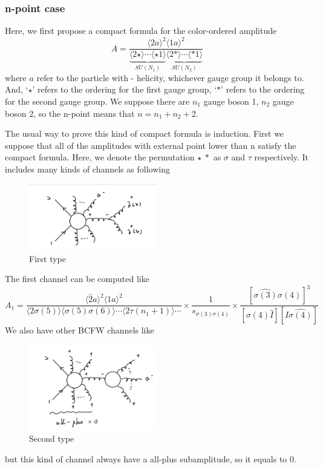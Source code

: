 \documentclass[12pt]{article}
\numberwithin{equation}{section}
\newcommand{\avg}[1]{\langle #1 \rangle}
\newcommand{\asqu}[1]{{\langle#1\rangle}^2}
\begin{document}
\subsubsection{n-point case}
Here, we first propose a compact formula for the color-ordered amplitude
\begin{equation}
    A=\frac{\asqu{2a}\!\asqu{1a}}{\underbrace{\avg{2\star}\cdots \avg{\star 1}}_{SU(N_1)}\underbrace{\avg{2\ast }\cdots \avg{\ast 1}}_{SU(N_2)}}
\end{equation}
where $a$ refer to the particle with - helicity, whichever gauge group it belongs to. And, `$\star$' refers to the ordering for the first gauge group, `$\ast$'
refers to the ordering for the second gauge group. We suppose there are $n_1$ gauge boson 1, $n_2$ gauge boson 2, so the n-point means that $n=n_1+n_2+2$.
\par
The usual way to prove this kind of compact formula is induction. First we suppose that all of the amplitudes with external point lower than n satisfy the compact formula.
Here, we denote the permutation $\star ~ \ast$ as $\sigma$ and $\tau$ respectively. It includes many kinds of channels as following
\begin{figure}[H]
    \centering
    \includegraphics[width=0.5\textwidth]{npt1.jpg}
    \caption{First type}
\end{figure}
The first channel can be computed like 
\begin{equation}
    A_1=\frac{\avg{\hat{2}a}^2\avg{1a}^2}{\avg{2\sigma(5)}\avg{\sigma(5)\sigma(6)}\cdots\avg{2\tau(n_1+1)}\cdots}\times\frac{1}{s_{\sigma(3)\sigma(4)}}\times\frac{[\hat{\sigma(3)}\sigma(4)]^3}{[\sigma(4)\hat{I}][\hat{I}\hat{\sigma(4)}]}
    \label{4.63}
\end{equation}
We also have other BCFW channels like
\begin{figure}[H]
    \centering
    \includegraphics[width=0.5\textwidth]{npt2.jpg}
    \caption{Second type}
\end{figure}
but this kind of channel always have a all-plus subamplitude, so it equals to 0.
\end{document}
